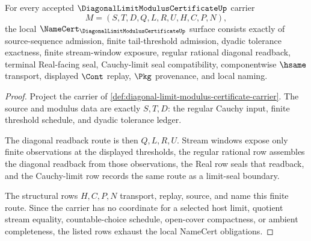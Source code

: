 \begin{theorem}
\label{thm:diagonal-limit-modulus-certificate-namecert-obligations}
For every accepted $\DiagonalLimitModulusCertificateUp$ carrier
$$
M=(S,T,D,Q,L,R,U,H,C,P,N),
$$
the local $\NameCert_{\DiagonalLimitModulusCertificateUp}$ surface consists exactly of source-sequence admission, finite tail-threshold admission, dyadic tolerance exactness, finite stream-window exposure, regular rational diagonal readback, terminal Real-facing seal, Cauchy-limit seal compatibility, componentwise $\hsame$ transport, displayed $\Cont$ replay, $\Pkg$ provenance, and local naming.
\end{theorem}
\begin{proof}
Project the carrier of \autoref{def:diagonal-limit-modulus-certificate-carrier}. The source and modulus data are exactly $S,T,D$: the regular Cauchy input, finite threshold schedule, and dyadic tolerance ledger.

The diagonal readback route is then $Q,L,R,U$. Stream windows expose only finite observations at the displayed thresholds, the regular rational row assembles the diagonal readback from those observations, the Real row seals that readback, and the Cauchy-limit row records the same route as a limit-seal boundary.

The structural rows $H,C,P,N$ transport, replay, source, and name this finite route. Since the carrier has no coordinate for a selected host limit, quotient stream equality, countable-choice schedule, open-cover compactness, or ambient completeness, the listed rows exhaust the local NameCert obligations.
\end{proof}

